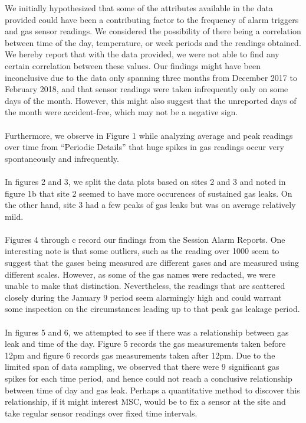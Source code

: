 \documentclass[twoside,twocolumn]{article}
\begin{document}
We initially hypothesized that some of the attributes available in the data provided could have been a contributing factor to the frequency of alarm triggers and gas sensor readings. We considered the possibility of there being a correlation between time of the day, temperature, or week periods and the readings obtained. We hereby report that with the data provided, we were not able to find any certain correlation between these values. Our findings might have been inconclusive due to the data only spanning three months from December 2017 to February 2018, and that sensor readings were taken infrequently only on some days of the month. However, this might also suggest that the unreported days of the month were accident-free, which may not be a negative sign.\\\\
Furthermore, we observe in Figure 1 while analyzing average and peak readings over time from ``Periodic Details'' that huge spikes in gas readings occur very spontaneously and infrequently.\\\\
In figures 2 and 3, we split the data plots based on sites 2 and 3 and noted in figure 1b that site 2 seemed to have more occurences of sustained gas leaks. On the other hand, site 3 had a few peaks of gas leaks but was on average relatively mild.\\\\
Figures 4 through c record our findings from the Session Alarm Reports. One interesting note is that some outliers, such as the reading over 1000 seem to suggest that the gases being measured are different gases and are measured using different scales. However, as some of the gas names were redacted, we were unable to make that distinction. Nevertheless, the readings that are scattered closely during the January 9 period seem alarmingly high and could warrant some inspection on the circumstances leading up to that peak gas leakage period.\\\\
In figures 5 and 6, we attempted to see if there was a relationship between gas leak and time of the day. Figure 5 records the gas measurements taken before 12pm and figure 6 records gas measurements taken after 12pm. Due to the limited span of data sampling, we observed that there were 9 significant gas spikes for each time period, and hence could not reach a conclusive relationship between time of day and gas leak. Perhaps a quantitative method to discover this relationship, if it might interest MSC, would be to fix a sensor at the site and take regular sensor readings over fixed time intervals.
\end{document}
